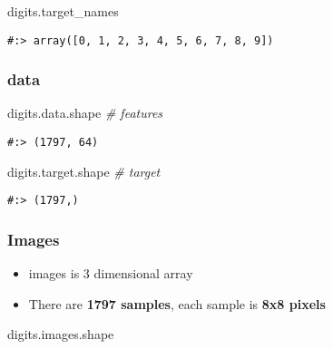 \documentclass[
]{book}
\newenvironment{Shaded}{\begin{snugshade}}{\end{snugshade}}
\newcommand{\CommentTok}[1]{\textcolor[rgb]{0.37,0.37,0.37}{\textit{#1}}}
\newcommand{\NormalTok}[1]{#1}
\providecommand{\tightlist}{%
  \setlength{\itemsep}{0pt}\setlength{\parskip}{0pt}}
\begin{document}
\begin{Shaded}
\begin{Highlighting}[]
\NormalTok{digits.target\_names}
\end{Highlighting}
\end{Shaded}

\begin{verbatim}
#:> array([0, 1, 2, 3, 4, 5, 6, 7, 8, 9])
\end{verbatim}

\hypertarget{data}{%
\subsubsection{data}\label{data}}

\begin{Shaded}
\begin{Highlighting}[]
\NormalTok{digits.data.shape  }\CommentTok{\# features}
\end{Highlighting}
\end{Shaded}

\begin{verbatim}
#:> (1797, 64)
\end{verbatim}

\begin{Shaded}
\begin{Highlighting}[]
\NormalTok{digits.target.shape }\CommentTok{\# target}
\end{Highlighting}
\end{Shaded}

\begin{verbatim}
#:> (1797,)
\end{verbatim}

\hypertarget{images}{%
\subsubsection{Images}\label{images}}

\begin{itemize}
\tightlist
\item
  images is 3 dimensional array\\
\item
  There are \textbf{1797 samples}, each sample is \textbf{8x8 pixels}
\end{itemize}

\begin{Shaded}
\begin{Highlighting}[]
\NormalTok{digits.images.shape}
\end{Highlighting}
\end{Shaded}
\end{document}
